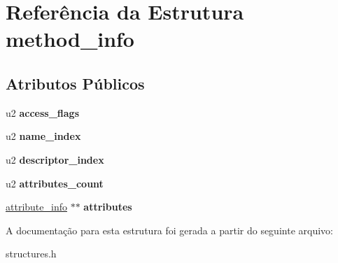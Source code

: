 \hypertarget{structmethod__info}{}\section{Referência da Estrutura method\+\_\+info}
\label{structmethod__info}
\subsection*{Atributos Públicos}
\begin{DoxyCompactItemize}
\item 
\mbox{\label{structmethod__info_a3b657027a141cdbc94ded28607c98be5}} 
u2 {\bfseries access\+\_\+flags}
\item 
\mbox{\label{structmethod__info_ab91d62d0658b77bba83f6bb685e3bbb9}} 
u2 {\bfseries name\+\_\+index}
\item 
\mbox{\label{structmethod__info_a7713103e0c8d060630ad62774fb9be37}} 
u2 {\bfseries descriptor\+\_\+index}
\item 
\mbox{\label{structmethod__info_ad9e5e1e2fc850806addadd6deab8565d}} 
u2 {\bfseries attributes\+\_\+count}
\item 
\mbox{\label{structmethod__info_ab6e323f51c4f05e92c09e3ac5e7e07dc}} 
\hyperlink{structattribute__info}{attribute\+\_\+info} $\ast$$\ast$ {\bfseries attributes}
\end{DoxyCompactItemize}


A documentação para esta estrutura foi gerada a partir do seguinte arquivo\+:\begin{DoxyCompactItemize}
\item 
structures.\+h\end{DoxyCompactItemize}
